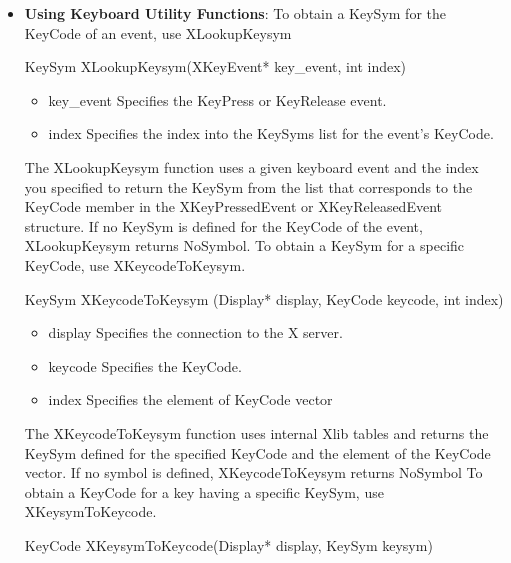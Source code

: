 \documentclass{report}
\begin{document}
\begin{itemize}
    \pagebreak 
    \begin{itemize}
        \item \textbf{Using Keyboard Utility Functions}: To obtain a KeySym for the KeyCode of an event, use XLookupKeysym
            \bigbreak \noindent 
            \begin{cppcode}
            KeySym XLookupKeysym(XKeyEvent* key_event, int index)
            \end{cppcode}
            \bigbreak \noindent
            \begin{itemize}
                \item key\_event Specifies the KeyPress or KeyRelease event.
                \item index Specifies the index into the KeySyms list for the event’s KeyCode.
            \end{itemize}
            The XLookupKeysym function uses a given keyboard event and the index you specified to return the KeySym from the list that corresponds to the KeyCode member in the XKeyPressedEvent or XKeyReleasedEvent structure. If no KeySym is defined for the KeyCode of the event, XLookupKeysym returns NoSymbol.
            \bigbreak \noindent 
            To obtain a KeySym for a specific KeyCode, use XKeycodeToKeysym.
            \bigbreak \noindent 
            \begin{cppcode}
            KeySym XKeycodeToKeysym (Display* display, KeyCode keycode, int index)
            \end{cppcode}
            \bigbreak \noindent
            \begin{itemize}
                \item display Specifies the connection to the X server.
                \item keycode Specifies the KeyCode.
                \item index Specifies the element of KeyCode vector
            \end{itemize}
            The XKeycodeToKeysym function uses internal Xlib tables and returns the KeySym defined for the specified KeyCode and the element of the KeyCode vector. If no symbol is defined, XKeycodeToKeysym returns NoSymbol
            \bigbreak \noindent 
            To obtain a KeyCode for a key having a specific KeySym, use XKeysymToKeycode.
            \bigbreak \noindent 
            \begin{cppcode}
            KeyCode XKeysymToKeycode(Display* display, KeySym keysym)

\end{cppcode}
\end{itemize}
\end{itemize}
\end{document}
